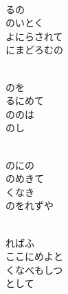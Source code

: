 \documentclass[10pt,b5j]{tarticle} %
\begin{document}
\vspace{1.5em} %
\newcommand{\linespace}{0.5em} %
\newcommand{\blocksize}{0.5\hsize} %
\newcommand{\itemmargin}{6em} %
\begin{enumerate} %
    \setlength{\itemindent}{\itemmargin} %
    \begin{minipage}[c]{\blocksize}
    
        \vspace{\linespace}
        \item~\\
        るの\\
        のいとく\\
        よにらされて\\
        にまどろむの
        
        \vspace{\linespace}
        \item~\\
        のを\\
        るにめて\\
        ののは\\
        のし
        
        \vspace{\linespace}
        \item~\\
        のにの\\
        のめきて\\
        くなき\\
        のをれずや
        
        \vspace{\linespace}
        \item~\\
        ればふ\\
        ここにめよと\\
        くなべもしつ\\
        として
        

\end{minipage}
\end{enumerate}
\end{document}
